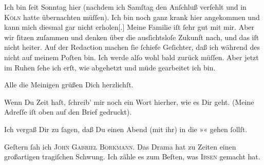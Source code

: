 \pstart
           Ich bin ſeit Sonntag hier (nachdem ich Samſtag den Anſchluß verfehlt und in \textsc{Köln} hatte übernachten müſſen). Ich bin noch ganz krank hier angekommen und kann
               mich diesmal gar nicht erholen{[}.{]} Meine Familie iſt ſehr gut mit
               mir. Aber wir ſitzen zuſammen und denken über die ausſichtsloſe Zukunft nach, und das
               iſt nicht heiter. Auf der Redaction machen ſie ſchiefe Geſichter, daß ich während des \label{K_L02809-1v}\label{K_L02809-1} nicht auf meinem Poſten bin. Ich werde alſo wohl bald zurück {\pb}müſſen. Aber jetzt im Ruhen ſehe ich erſt, wie
               abgehetzt und müde gearbeitet ich bin.\pend
           
\pstart
           Alle die Meinigen grüßen Dich herzlichſt.\pend
           
\pstart
           Wenn Du Zeit haſt, ſchreib’ mir noch ein Wort hierher, wie es Dir geht. (Meine
               Adreſſe iſt oben auf den Brief gedruckt).\pend
           
\pstart
           Ich vergaß Dir zu ſagen, daß Du einen Abend (mit ihr) in die »\label{K_L02809-2v}\label{K_L02809-2}« gehen ſollſt.\pend
           
\pstart
           Geſtern ſah ich \textsc{John Gabriel Borkmann}.  Das Drama hat zu Zeiten einen
               großartigen tragiſchen Schwung. Ich zähle es zum Beſten, was \strikeout{\textcolor{gray}{×}\-\textcolor{gray}{×}\-\textcolor{gray}{×}}{ }\textsc{Ibsen} gemacht hat.\pend
           

